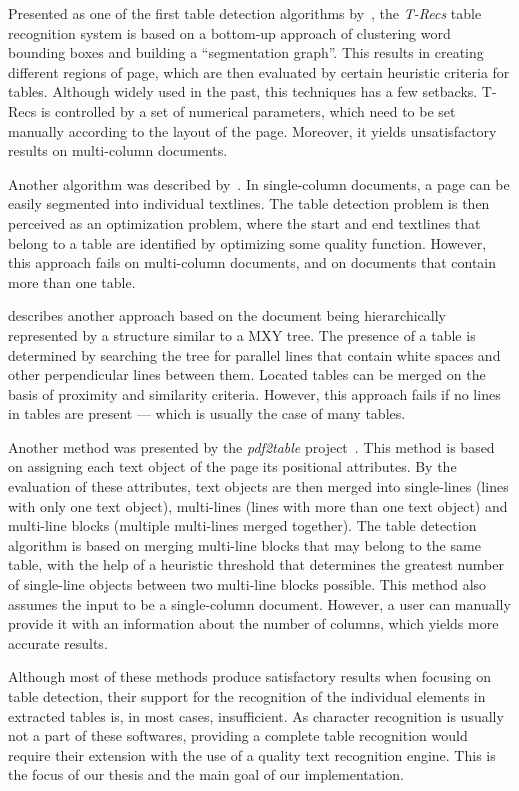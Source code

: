 Presented as one of the first table detection algorithms by~\citet{TRecs}, the \emph{T-Recs} table recognition system is based on a bottom-up approach of clustering word bounding boxes and building a ``segmentation graph''. This results in creating different regions of page, which are then evaluated by certain heuristic criteria for tables. Although widely used in the past, this techniques has a few setbacks. T-Recs is controlled by a set of numerical parameters, which need to be set manually according to the layout of the page. Moreover, it yields unsatisfactory results on multi-column documents.

Another algorithm was described by~\citet{MediumTable}. In single-column documents, a page can be easily segmented into individual textlines. The table detection problem is then perceived as an optimization problem, where the start and end textlines that belong to a table are identified by optimizing some quality function. However, this approach fails on multi-column documents, and on documents that contain more than one table.

\citet{tableDetectCesarini} describes another approach based on the document being hierarchically represented by a structure similar to a MXY tree. The presence of a table is determined by searching the tree for parallel lines that contain white spaces and other perpendicular lines between them. Located tables can be merged on the basis of proximity and similarity criteria. However, this approach fails if no lines in tables are present --- which is usually the case of many tables.

Another method was presented by the \emph{pdf2table} project~\cite{pdf2table}. This method is based on assigning each text object of the page its positional attributes. By the evaluation of these attributes, text objects are then merged into single-lines (lines with only one text object), multi-lines (lines with more than one text object) and multi-line blocks (multiple multi-lines merged together). The table detection algorithm is based on merging multi-line blocks that may belong to the same table, with the help of a heuristic threshold that determines the greatest number of single-line objects between two multi-line blocks possible. This method also assumes the input to be a single-column document. However, a user can manually provide it with an information about the number of columns, which yields more accurate results.

Although most of these methods produce satisfactory results when focusing on table detection, their support for the recognition of the individual elements in extracted tables is, in most cases, insufficient. As character recognition is usually not a part of these softwares, providing a complete table recognition would require their extension with the use of a quality text recognition engine. This is the focus of our thesis and the main goal of our implementation.